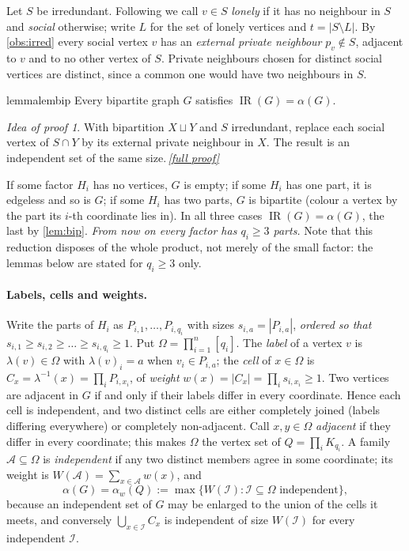 \documentclass[11pt,a4paper]{article}
\theoremstyle{plain}
\theoremstyle{definition}
\theoremstyle{remark}
\newtheorem*{proofidea}{Idea of proof}
\newcommand{\fullproofref}[1]{\,\hyperref[#1]{\textit{[full proof]}}}
\newcommand{\IR}{\operatorname{IR}}
\newcommand{\cA}{\mathcal A}
\newcommand{\cI}{\mathcal I}
\newcommand{\Om}{\Omega}
\newcommand{\alw}{\alpha_w}
\newcommand{\lab}{\lambda}
\begin{document}
Let $S$ be irredundant. Following \cite{AD20} we call $v\in S$ \emph{lonely} if it has no neighbour in $S$ and \emph{social} otherwise; write $L$ for the set of lonely vertices and $t=|S\setminus L|$. By \cref{obs:irred} every social vertex $v$ has an \emph{external private neighbour} $p_v\notin S$, adjacent to $v$ and to no other vertex of $S$. Private neighbours chosen for distinct social vertices are distinct, since a common one would have two neighbours in $S$.

\begin{restatable}{lemma}{lembip}\label{lem:bip}
Every bipartite graph $G$ satisfies $\IR(G)=\alpha(G)$.
\end{restatable}
\begin{proofidea}
With bipartition $X\sqcup Y$ and $S$ irredundant, replace each social vertex of $S\cap Y$ by its external private neighbour in $X$. The result is an independent set of the same size.\fullproofref{pf:bip}
\end{proofidea}

If some factor $H_i$ has no vertices, $G$ is empty; if some $H_i$ has one part, it is edgeless and so is $G$; if some $H_i$ has two parts, $G$ is bipartite (colour a vertex by the part its $i$-th coordinate lies in). In all three cases $\IR(G)=\alpha(G)$, the last by \cref{lem:bip}. \emph{From now on every factor has $q_i\ge3$ parts.} Note that this reduction disposes of the whole product, not merely of the small factor: the lemmas below are stated for $q_i\ge3$ only.

\paragraph{Labels, cells and weights.}
Write the parts of $H_i$ as $P_{i,1},\dots,P_{i,q_i}$ with sizes $s_{i,a}=|P_{i,a}|$, \emph{ordered so that} $s_{i,1}\ge s_{i,2}\ge\dots\ge s_{i,q_i}\ge1$. Put $\Om=\prod_{i=1}^n[q_i]$. The \emph{label} of a vertex $v$ is $\lab(v)\in\Om$ with $\lab(v)_i=a$ when $v_i\in P_{i,a}$; the \emph{cell} of $x\in\Om$ is $C_x=\lab^{-1}(x)=\prod_iP_{i,x_i}$, of \emph{weight} $w(x)=|C_x|=\prod_is_{i,x_i}\ge1$. Two vertices are adjacent in $G$ if and only if their labels differ in every coordinate. Hence each cell is independent, and two distinct cells are either completely joined (labels differing everywhere) or completely non-adjacent. Call $x,y\in\Om$ \emph{adjacent} if they differ in every coordinate; this makes $\Om$ the vertex set of $Q=\prod_iK_{q_i}$. A family $\cA\subseteq\Om$ is \emph{independent} if any two distinct members agree in some coordinate; its weight is $W(\cA)=\sum_{x\in\cA}w(x)$, and
\begin{equation}\label{eq:alphaw}
\alpha(G)=\alw(Q):=\max\{W(\cI):\cI\subseteq\Om\text{ independent}\},
\end{equation}
because an independent set of $G$ may be enlarged to the union of the cells it meets, and conversely $\bigcup_{x\in\cI}C_x$ is independent of size $W(\cI)$ for every independent $\cI$.
\end{document}
